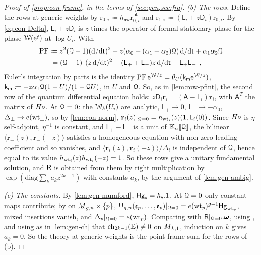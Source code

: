 \begin{proof}[Proof of \cref{prop:con-frame}, in the terms of \cref{sec:gen,sec:fra}]
\emph{(b) The rows.} Define the rows at generic weights by $\mathrm{r}_{0,i}\coloneqq h_{\mathsf{nw}}\mathrm{r}^{\mathrm{pt}}_{0,i}$ and $\mathrm{r}_{1,i}\coloneqq(\mathsf{L}_i+z\mathsf{D}_i)\mathrm{r}_{0,i}$. By \cref{eq:con-Delta}, $\mathsf{L}_i+z\mathsf{D}_i$ is $z$ times the operator of formal stationary phase for the phase $\mathcal{W}(\mathrm{e}^{\mathsf{y}})$ at $\log U_i$. With
\[
\begin{aligned}
\mathrm{PF}&\coloneqq z^2(\mathcal{Q}-1)(\mathrm{d}/\mathrm{d}\mathsf{t})^2-z(\alpha_0+(\alpha_1+\alpha_2)\mathcal{Q})\,\mathrm{d}/\mathrm{d}\mathsf{t}+\alpha_1\alpha_2\mathcal{Q}\\
&\phantom{:}=(\mathcal{Q}-1)\big[(z\,\mathrm{d}/\mathrm{d}\mathsf{t})^2-(\mathsf{L}_++\mathsf{L}_-)z\,\mathrm{d}/\mathrm{d}\mathsf{t}+\mathsf{L}_+\mathsf{L}_-\big],
\end{aligned}
\]
Euler's integration by parts is the identity $\mathrm{PF}\,\mathrm{e}^{\mathcal{W}/z}=\theta_U(\mathsf{k}_{\mathsf{m}}\mathrm{e}^{\mathcal{W}/z})$, $\mathsf{k}_{\mathsf{m}}\coloneqq-z\alpha_1\mathcal{Q}(1-U)/(1-\mathcal{Q} U)$, in $U$ and $\mathcal{Q}$. So, as in \cref{lem:row-pfint}, the second row of the quantum differential equation holds: $z\mathsf{D}_i\mathbf{r}_i=(\mathsf{A}-\mathsf{L}_i)\mathbf{r}_i$, with $\mathsf{A}^T$ the matrix of $H\circ$. At $\mathcal{Q}=0$: the $\mathcal{W}_k(U_i)$ are analytic, $\mathsf{L}_+\to 0$, $\mathsf{L}_-\to-\alpha_0$, $\Delta_\pm\to e(\mathrm{wt}_\pm)$, so by \cref{lem:con-norm}, $\mathbf{r}_i(z)|_{\mathcal{Q}=0}=h_{\mathrm{wt}_i}(z)(1,\mathsf{L}_i(0))$. Since $H\circ$ is $\eta$-self-adjoint, $\eta^{-1}$ is constant, and $\mathsf{L}_+-\mathsf{L}_-$ is a unit of $\mathbb{K}_{\alpha}[\![ \mathcal{Q} ]\!]$, the bilinear $\langle\mathbf{r}_+(z),\mathbf{r}_-(-z)\rangle$ satisfies a homogeneous equation with non-zero leading coefficient and so vanishes, and $\langle\mathbf{r}_i(z),\mathbf{r}_i(-z)\rangle/\Delta_i$ is independent of $\mathcal{Q}$, hence equal to its value $h_{\mathrm{wt}_i}(z)h_{\mathrm{wt}_i}(-z)=1$. So these rows give a unitary fundamental solution, and $\mathsf{R}$ is obtained from them by right multiplication by $\exp(\mathrm{diag}\sum_ka_kz^{2k-1})$ with constants $a_k$, by the argument of \cref{lem:gen-ambig}.

\emph{(c) The constants.} By \cref{lem:gen-mumford}, $\mathsf{Hg}_{\mathsf{v}}=h_{\mathsf{v}}.1$. At $\mathcal{Q}=0$ only constant maps contribute; by \cite{GP99} on $\overline{M}_{g,n}\times\{p\}$, $\Omega_{g,n}(\mathfrak{e}_p,\dots,\mathfrak{e}_p)|_{\mathcal{Q}=0}=e(\mathrm{wt}_p)^{g-1}\mathsf{Hg}_{\mathrm{wt}_p}$, mixed insertions vanish, and $\Delta_p|_{\mathcal{Q}=0}=e(\mathrm{wt}_p)$. Comparing with $\mathsf{R}|_{\mathcal{Q}=0}.\boldsymbol{\omega}$, using \cite[Prop.~2.14]{PPZ15}, and using as in \cref{lem:gen-ch} that $\mathrm{ch}_{2k-1}(\mathbb{E})\neq 0$ on $\overline{M}_{k,1}$, induction on $k$ gives $a_k=0$. So the theory at generic weights is the point-frame sum for the rows of (b).


\end{proof}

